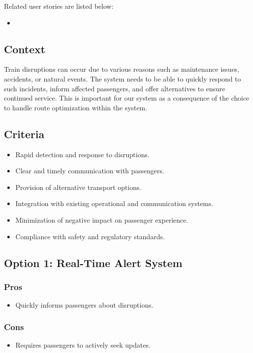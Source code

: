 Related user stories are listed below:
\begin{itemize}[noitemsep]
    \item \userStoryTwentySix
\end{itemize}

\subsection*{Context}
Train disruptions can occur due to various reasons such as maintenance issues, accidents, or natural events. The system needs to be able to quickly respond to such incidents, inform affected passengers, and offer alternatives to ensure continued service.
This is important for our system as a consequence of the choice to handle route optimization within the system.

\subsection*{Criteria}
\begin{itemize}[noitemsep]
    \item Rapid detection and response to disruptions.
    \item Clear and timely communication with passengers.
    \item Provision of alternative transport options.
    \item Integration with existing operational and communication systems.
    \item Minimization of negative impact on passenger experience.
    \item Compliance with safety and regulatory standards.
\end{itemize}


\subsection*{Option 1: Real-Time Alert System}
\subsubsection*{Pros}
\begin{itemize}
    \item Quickly informs passengers about disruptions.
\end{itemize}
\subsubsection*{Cons}
\begin{itemize}
    \item Requires passengers to actively seek updates.
\end{itemize}

